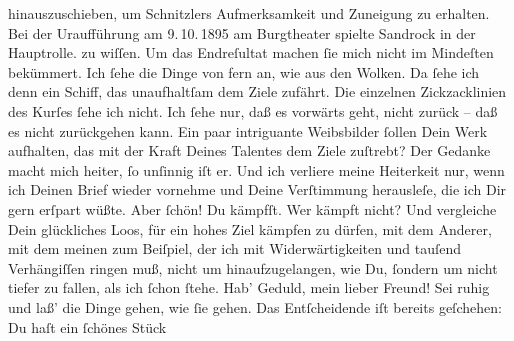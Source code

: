 \begin{ledgroupsized}[t]{13cm}
{{{                  hinauszuschieben, um Schnitzlers Aufmerksamkeit und Zuneigung zu erhalten. Bei der Uraufführung am 9. 10. 1895 am Burgtheater spielte Sandrock in der Hauptrolle.}}}\label{K_L02728-1h} zu wiſſen. {\pb}Um das Endreſultat machen ſie mich nicht im Mindeſten bekümmert. Ich
               ſehe die Dinge von fern an, wie aus den Wolken. Da ſehe ich denn ein Schiff, das
               unaufhaltſam dem Ziele zufährt. Die einzelnen Zickzacklinien des Kurſes ſehe ich
               nicht. Ich ſehe nur, daß es vorwärts geht, nicht zurück – daß es nicht zurückgehen
               kann. Ein paar intriguante Weibsbilder ſollen Dein Werk aufhalten, das mit der Kraft Deines Talentes dem Ziele zuſtrebt? Der Gedanke
               macht mich heiter, ſo unſinnig iſt er. {\pb}Und ich
               verliere meine Heiterkeit nur, wenn ich Deinen Brief wieder vornehme und Deine
               Verſtimmung herausleſe, die ich Dir gern erſpart wüßte. Aber ſchön! Du kämpfſt. Wer
               kämpft nicht? Und vergleiche Dein glückliches Loos, für ein hohes Ziel kämpfen zu
               dürfen, mit dem Anderer, mit dem meinen zum Beiſpiel, der ich mit Widerwärtigkeiten
               und tauſend Verhängiſſen ringen muß, nicht um hinaufzugelangen, wie Du, ſondern um
               nicht tiefer zu fallen, als ich ſchon ſtehe.\pend
           \pstart
           {\pb}Hab’ Geduld, mein lieber Freund! Sei ruhig und laß’
               die Dinge gehen, wie ſie gehen. Das Entſcheidende iſt bereits geſchehen: Du haſt ein
               ſchönes Stück

\end{ledgroupsized}
